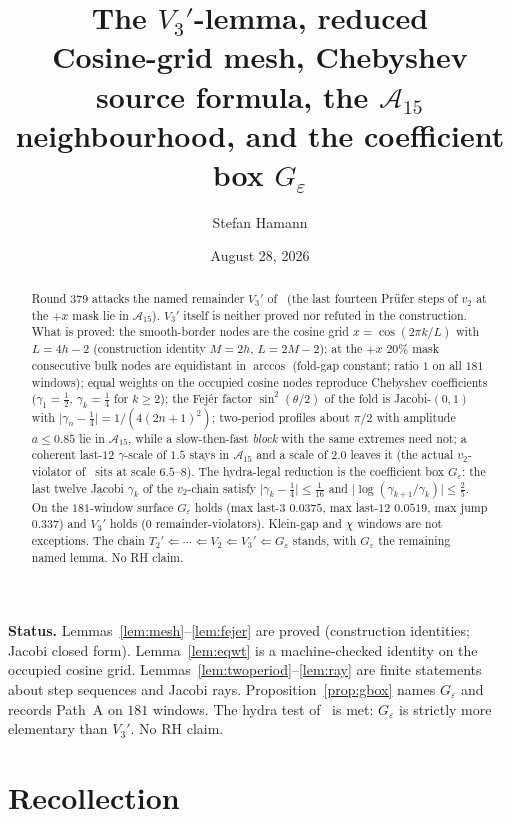 \documentclass[11pt]{article}
\title{\bfseries The $V_3'$-lemma, reduced\\[2mm]
\large Cosine-grid mesh, Chebyshev source formula,
the $\mathcal{A}_{15}$ neighbourhood, and the coefficient box $G_\varepsilon$}
\author{Stefan Hamann}
\date{August 28, 2026}
\theoremstyle{remark}
\begin{document}
\maketitle

\begin{abstract}\noindent
Round 379 attacks the named remainder $V_3'$ of~\cite{v2lem}
(the last fourteen Pr\"ufer steps of $v_2$ at the $+x$ mask lie
in $\mathcal{A}_{15}$).  $V_3'$ itself is neither proved nor
refuted in the construction.  What is proved: the smooth-border
nodes are the cosine grid $x=\cos(2\pi k/L)$ with
$L=4h-2$ (construction identity $M=2h$, $L=2M-2$); at the
$+x$ $20\%$ mask consecutive bulk nodes are equidistant in
$\arccos$ (fold-gap constant; ratio $1$ on all $181$ windows);
equal weights on the occupied cosine nodes reproduce Chebyshev
coefficients ($\gamma_1=\tfrac12$, $\gamma_k=\tfrac14$ for
$k\ge 2$); the Fej\'er factor $\sin^2(\theta/2)$ of the fold is
Jacobi-$(0,1)$ with
$\lvert\gamma_n-\tfrac14\rvert=1/(4(2n+1)^2)$;
two-period profiles about $\pi/2$ with amplitude $a\le 0.85$
lie in $\mathcal{A}_{15}$, while a slow-then-fast
\emph{block} with the same extremes need not;
a coherent last-$12$ $\gamma$-scale of $1.5$ stays in
$\mathcal{A}_{15}$ and a scale of $2.0$ leaves it (the actual
$v_2$-violator of~\cite{v2lem} sits at scale $6.5$--$8$).
The hydra-legal reduction is the coefficient box $G_\varepsilon$:
the last twelve Jacobi $\gamma_k$ of the $v_2$-chain satisfy
$\lvert\gamma_k-\tfrac14\rvert\le\tfrac1{16}$ and
$\lvert\log(\gamma_{k+1}/\gamma_k)\rvert\le\tfrac25$.
On the $181$-window surface $G_\varepsilon$ holds (max last-$3$
$0.0375$, max last-$12$ $0.0519$, max jump $0.337$) and
$V_3'$ holds ($0$ remainder-violators).  Klein-gap and $\chi$
windows are not exceptions.  The chain
$T_2'\Leftarrow\cdots\Leftarrow V_2\Leftarrow V_3'\Leftarrow
G_\varepsilon$ stands, with $G_\varepsilon$ the remaining named
lemma.  No RH claim.
\end{abstract}

\medskip\noindent
\textbf{Status.}\enspace
Lemmas~\ref{lem:mesh}--\ref{lem:fejer} are proved (construction
identities; Jacobi closed form).
Lemma~\ref{lem:eqwt} is a machine-checked identity on the occupied
cosine grid.
Lemmas~\ref{lem:twoperiod}--\ref{lem:ray} are finite statements
about step sequences and Jacobi rays.
Proposition~\ref{prop:gbox} names $G_\varepsilon$ and records
Path~A on $181$ windows.  The hydra test of~\cite{v2} is met:
$G_\varepsilon$ is strictly more elementary than $V_3'$.
No RH claim.

\section{Recollection}\label{sec:rec}
\end{document}
